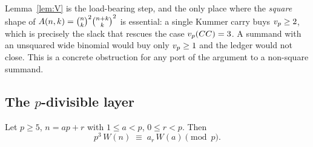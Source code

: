 \begin{remark}\label{rem:square}
Lemma~\ref{lem:V} is the load-bearing step, and the only place where the \emph{square}
shape of $A(n,k)=\binom{n}{k}^2\binom{n+k}{k}^2$ is essential: a single Kummer carry buys
$v_p\ge2$, which is precisely the slack that rescues the case $v_p(CC)=3$. A summand with
an unsquared wide binomial would buy only $v_p\ge1$ and the ledger would not close. This
is a concrete obstruction for any port of the argument to a non-square summand.
\end{remark}

\subsection{The \texorpdfstring{$p$}{p}-divisible layer}

\begin{lemma}[$W$-part]\label{lem:Wpart}
Let $p\ge5$, $n=ap+r$ with $1\le a<p$, $0\le r<p$. Then
\begin{equation}\label{eq:Wpart}
   p^3\,W(n)\;\equiv\;a_r\,W(a)\pmod p .
\end{equation}
\end{lemma}

